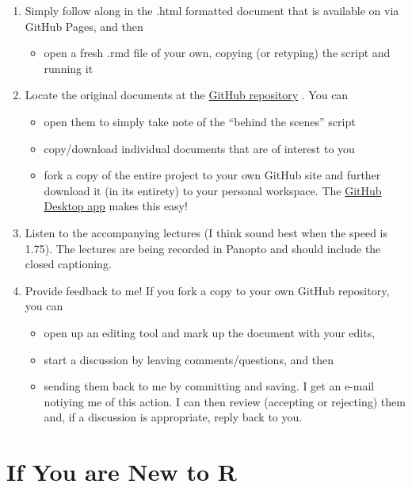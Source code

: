 \documentclass[
]{book}
\providecommand{\tightlist}{%
  \setlength{\itemsep}{0pt}\setlength{\parskip}{0pt}}
\begin{document}
\begin{enumerate}
\def\labelenumi{\arabic{enumi}.}
\tightlist
\item
  Simply follow along in the .html formatted document that is available on via GitHub Pages, and then

  \begin{itemize}
  \tightlist
  \item
    open a fresh .rmd file of your own, copying (or retyping) the script and running it
  \end{itemize}
\item
  Locate the original documents at the \href{https://github.com/lhbikos/ReC_MultivModel}{GitHub repository} . You can

  \begin{itemize}
  \tightlist
  \item
    open them to simply take note of the ``behind the scenes'' script
  \item
    copy/download individual documents that are of interest to you
  \item
    fork a copy of the entire project to your own GitHub site and further download it (in its entirety) to your personal workspace. The \href{https://desktop.github.com/}{GitHub Desktop app} makes this easy!
  \end{itemize}
\item
  Listen to the accompanying lectures (I think sound best when the speed is 1.75). The lectures are being recorded in Panopto and should include the closed captioning.
\item
  Provide feedback to me! If you fork a copy to your own GitHub repository, you can

  \begin{itemize}
  \tightlist
  \item
    open up an editing tool and mark up the document with your edits,
  \item
    start a discussion by leaving comments/questions, and then
  \item
    sending them back to me by committing and saving. I get an e-mail notiying me of this action. I can then review (accepting or rejecting) them and, if a discussion is appropriate, reply back to you.
  \end{itemize}
\end{enumerate}

\hypertarget{if-you-are-new-to-r}{%
\section{If You are New to R}\label{if-you-are-new-to-r}}
\end{document}
